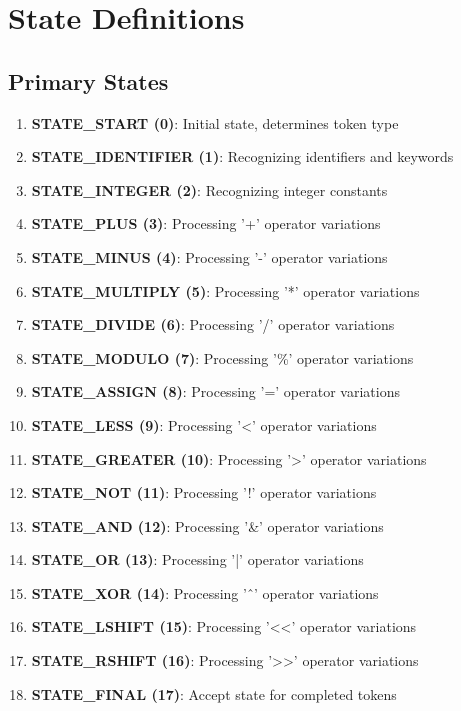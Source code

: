 \documentclass[12pt,a4paper]{article}
\begin{document}
\section{State Definitions}

\subsection{Primary States}
\begin{enumerate}
    \item \textbf{STATE\_START (0)}: Initial state, determines token type
    \item \textbf{STATE\_IDENTIFIER (1)}: Recognizing identifiers and keywords
    \item \textbf{STATE\_INTEGER (2)}: Recognizing integer constants
    \item \textbf{STATE\_PLUS (3)}: Processing '+' operator variations
    \item \textbf{STATE\_MINUS (4)}: Processing '-' operator variations
    \item \textbf{STATE\_MULTIPLY (5)}: Processing '*' operator variations
    \item \textbf{STATE\_DIVIDE (6)}: Processing '/' operator variations
    \item \textbf{STATE\_MODULO (7)}: Processing '\%' operator variations
    \item \textbf{STATE\_ASSIGN (8)}: Processing '=' operator variations
    \item \textbf{STATE\_LESS (9)}: Processing '<' operator variations
    \item \textbf{STATE\_GREATER (10)}: Processing '>' operator variations
    \item \textbf{STATE\_NOT (11)}: Processing '!' operator variations
    \item \textbf{STATE\_AND (12)}: Processing '\&' operator variations
    \item \textbf{STATE\_OR (13)}: Processing '|' operator variations
    \item \textbf{STATE\_XOR (14)}: Processing '\^{\ }' operator variations
    \item \textbf{STATE\_LSHIFT (15)}: Processing '<<' operator variations
    \item \textbf{STATE\_RSHIFT (16)}: Processing '>>' operator variations
    \item \textbf{STATE\_FINAL (17)}: Accept state for completed tokens
\end{enumerate}
\end{document}
